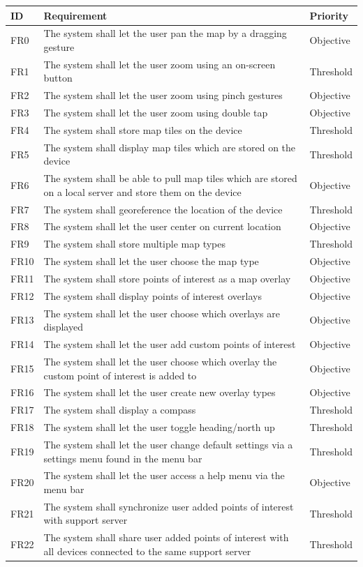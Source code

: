 \documentclass{article}
\begin{document}
\begin{tabular}{ | p{.5in} | p{4.5in} | p{1in}|}
\hline
\textbf{ID} & \textbf{Requirement} & \textbf{Priority}\\
\hline
\hline
FR0 & The system shall let the user pan the map by a dragging gesture & Objective\\
\hline
FR1 & The system shall let the user zoom using an on-screen button & Threshold\\
\hline
FR2 & The system shall let the user zoom using pinch gestures & Objective\\
\hline
FR3 & The system shall let the user zoom using double tap & Objective\\
\hline
FR4 & The system shall store map tiles on the device & Threshold\\
\hline
FR5 & The system shall display map tiles which are stored on the device & Threshold\\
\hline
FR6 & The system shall be able to pull map tiles which are stored on a local server and store them on the device & Objective\\
\hline
FR7 & The system shall georeference the location of the device & Threshold\\
\hline
FR8 & The system shall let the user center on current location & Objective\\
\hline
FR9 & The system shall store multiple map types & Threshold\\
\hline
FR10 & The system shall let the user choose the map type & Objective\\
\hline
FR11 & The system shall store points of interest as a map overlay & Objective\\
\hline
FR12 & The system shall display points of interest overlays & Objective\\
\hline
FR13 & The system shall let the user choose which overlays are displayed & Objective\\
\hline
FR14 & The system shall let the user add custom points of interest & Objective\\
\hline
FR15 & The system shall let the user choose which overlay the custom point of interest is added to & Objective\\
\hline
FR16 & The system shall let the user create new overlay types & Objective\\
\hline
FR17 & The system shall display a compass & Threshold\\
\hline
FR18 & The system shall let the user toggle heading/north up & Threshold\\
\hline
FR19 & The system shall let the user change default settings via a settings menu found in the menu bar & Threshold\\
\hline
FR20 & The system shall let the user access a help menu via the menu bar & Objective\\
\hline
FR21 & The system shall synchronize user added points of interest with support server & Threshold\\
\hline
FR22 & The system shall share user added points of interest with all devices connected to the same support server & Threshold\\
\hline
\end{tabular}
\end{document}
